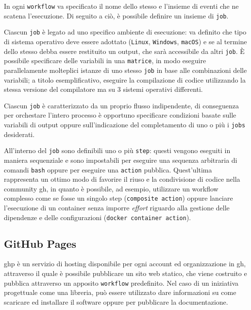 \documentclass[12pt,a4paper,openright,twoside]{book}
\begin{document}
In ogni \texttt{workflow} va specificato il nome dello stesso e l'insieme di eventi che ne scatena 
l'esecuzione. 
Di seguito a ciò, è possibile definire un insieme di \texttt{job}.

Ciascun \texttt{job} è legato ad uno specifico ambiente di esecuzione: va definito che tipo di
sistema operativo deve essere adottato (\texttt{Linux}, \texttt{Windows}, \texttt{macOS})
e se al termine dello stesso debba essere restituito un output, che sarà accessibile da altri \texttt{job}.
È possibile specificare delle variabili in una \texttt{matrice}, in modo eseguire parallelamente molteplici istanze di uno stesso \texttt{job} 
in base alle combinazioni delle variabili; a titolo esemplificativo, eseguire la compilazione di codice utilizzando
la stessa versione del compilatore ma su 3 sistemi operativi differenti.  

Ciascun \texttt{job} è caratterizzato da un proprio flusso indipendente, di conseguenza
per orchestare l'intero processo è opportuno specificare condizioni basate sulle variabili di output 
oppure sull'indicazione del completamento di uno o più i \texttt{jobs} desiderati.

All'interno del \texttt{job} sono definibili uno o più \texttt{step}: questi vengono eseguiti in maniera sequenziale
e sono impostabili per eseguire una sequenza arbitraria di comandi \texttt{bash} oppure
per eseguire una \texttt{action} pubblica.
Quest'ultima rappresenta un ottimo modo di favorire il riuso
e la condivisione di codice nella community \ac{gh}, in quanto è possibile, ad esempio, utilizzare un workflow complesso
come se fosse un singolo step (\texttt{composite action}) oppure lanciare l'esecuzione di un container senza
imporre \textit{effort} riguardo alla gestione delle dipendenze e delle configurazioni (\texttt{docker container action}).

\subsection{GitHub Pages}
 \ac{ghp} è un servizio di hosting disponibile per ogni account ed organizzazione in \ac{gh},
 attraverso il quale è possibile pubblicare un sito web statico, che viene costruito e
 pubblica attraverso un apposito \texttt{workflow} predefinito. 
 Nel caso di un iniziativa progettuale come una libreria, può essere utilizzato dare informazioni 
 su come scaricare ed installare il software oppure per pubblicare la documentazione.
\end{document}
